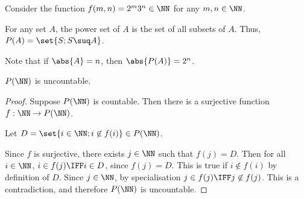 \documentclass[11pt]{scrartcl}
\begin{document}
 
 Consider the function $f(m, n) = 2^m\* 3^{n}\in\NN$ for any
 $m, n\in\NN$.
 
 \begin{definition}
   For any set $A$, the power set of $A$ is the set of all subsets of
   $A$. Thus, $P(A) = \set{S; S\suq A}$. 
 \end{definition}

 Note that if $\abs{A}=n$, then $\abs{P(A)} = 2^n$.

 \begin{theorem}
   $P(\NN)$ is uncountable.
 \end{theorem}

 \begin{proof}
   \hfill

   Suppose $P(\NN)$ is countable. Then there is a surjective function $f:\NN \to P(\NN)$.

   Let $D = \set{i\in\NN; i\not\in f(i)} \in P(\NN)$.

   Since $f$ is surjective, there exists $j\in\NN$ such that $f(j) = D$. Then for all $i\in\NN$, $i\in f(j)\IFF i\in D$, since $f(j) = D$. This is true if $i\not\in f(i)$ by definition of $D$. Since $j\in\NN$, by specialisation $j\in f(j) \IFF j\not\in f(j)$. This is a contradiction, and therefore $P(\NN)$ is uncountable.
 \end{proof}





 
\end{document}
